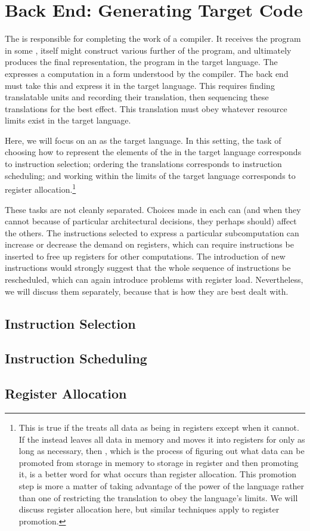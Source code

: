 \section{Back End: Generating Target Code}
The  is responsible for completing the work of a compiler. It receives the program in some \IR{}, itself might construct various further \IRs of the program, and ultimately produces the final representation, the program in the target language. The \IR expresses a computation in a form understood by the compiler. The back end must take this and express it in the target language. This requires finding translatable units and recording their translation, then sequencing these translations for the best effect. This translation must obey whatever resource limits exist in the target language.

Here, we will focus on an \ISL as the target language. In this setting, the task of choosing how to represent the elements of the \IR in the target language corresponds to instruction selection; ordering the translations corresponds to instruction scheduling; and working within the limits of the target language corresponds to register allocation.\footnote{This is true if the \IR treats all data as being in registers except when it cannot. If the \IR instead leaves all data in memory and moves it into registers for only as long as necessary, then , which is the process of figuring out what data can be promoted from storage in memory to storage in register and then promoting it, is a better word for what occurs than register allocation. This promotion step is more a matter of taking advantage of the power of the language rather than one of restricting the translation to obey the language's limits. We will discuss register allocation here, but similar techniques apply to register promotion.}

These tasks are not cleanly separated. Choices made in each can (and when they cannot because of particular architectural decisions, they perhaps should) affect the others. The instructions selected to express a particular subcomputation can increase or decrease the demand on registers, which can require instructions be inserted to free up registers for other computations. The introduction of new instructions would strongly suggest that the whole sequence of instructions be rescheduled, which can again introduce problems with register load. Nevertheless, we will discuss them separately, because that is how they are best dealt with.

\subsection{Instruction Selection}


\subsection{Instruction Scheduling}

\subsection{Register Allocation}
